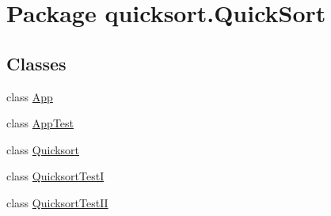 \hypertarget{namespacequicksort_1_1_quick_sort}{}\section{Package quicksort.\+Quick\+Sort}
\label{namespacequicksort_1_1_quick_sort}
\subsection*{Classes}
\begin{DoxyCompactItemize}
\item 
class \hyperlink{classquicksort_1_1_quick_sort_1_1_app}{App}
\item 
class \hyperlink{classquicksort_1_1_quick_sort_1_1_app_test}{App\+Test}
\item 
class \hyperlink{classquicksort_1_1_quick_sort_1_1_quicksort}{Quicksort}
\item 
class \hyperlink{classquicksort_1_1_quick_sort_1_1_quicksort_test_i}{Quicksort\+TestI}
\item 
class \hyperlink{classquicksort_1_1_quick_sort_1_1_quicksort_test_i_i}{Quicksort\+Test\+II}
\end{DoxyCompactItemize}
